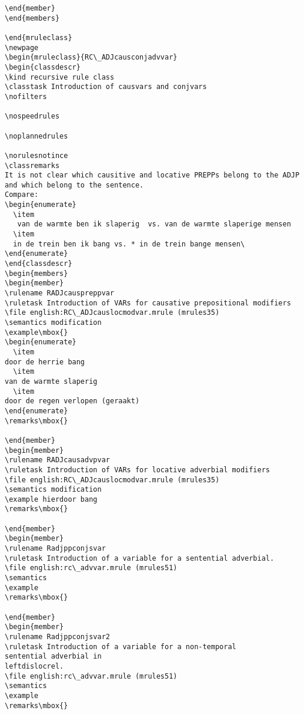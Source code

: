 \begin{verbatim}
\end{member}
\end{members}

\end{mruleclass}
\newpage
\begin{mruleclass}{RC\_ADJcausconjadvvar}
\begin{classdescr}
\kind recursive rule class
\classtask Introduction of causvars and conjvars
\nofilters

\nospeedrules

\noplannedrules

\norulesnotince
\classremarks 
It is not clear which causitive and locative PREPPs belong to the ADJP
and which belong to the sentence. 
Compare: 
\begin{enumerate}
  \item 
   van de warmte ben ik slaperig  vs. van de warmte slaperige mensen 
  \item
  in de trein ben ik bang vs. * in de trein bange mensen\
\end{enumerate}
\end{classdescr}
\begin{members}
\begin{member}
\rulename RADJcauspreppvar 
\ruletask Introduction of VARs for causative prepositional modifiers 
\file english:RC\_ADJcauslocmodvar.mrule (mrules35)
\semantics modification
\example\mbox{}
\begin{enumerate}
  \item 
door de herrie bang 
  \item
van de warmte slaperig
  \item 
door de regen verlopen (geraakt)
\end{enumerate}
\remarks\mbox{}

\end{member}
\begin{member}
\rulename RADJcausadvpvar
\ruletask Introduction of VARs for locative adverbial modifiers 
\file english:RC\_ADJcauslocmodvar.mrule (mrules35)
\semantics modification
\example hierdoor bang 
\remarks\mbox{}

\end{member}
\begin{member}
\rulename Radjppconjsvar
\ruletask Introduction of a variable for a sentential adverbial.
\file english:rc\_advvar.mrule (mrules51)
\semantics 
\example
\remarks\mbox{}

\end{member}
\begin{member}
\rulename Radjppconjsvar2
\ruletask Introduction of a variable for a non-temporal 
sentential adverbial in 
leftdislocrel.
\file english:rc\_advvar.mrule (mrules51)
\semantics 
\example
\remarks\mbox{}


\end{verbatim}
